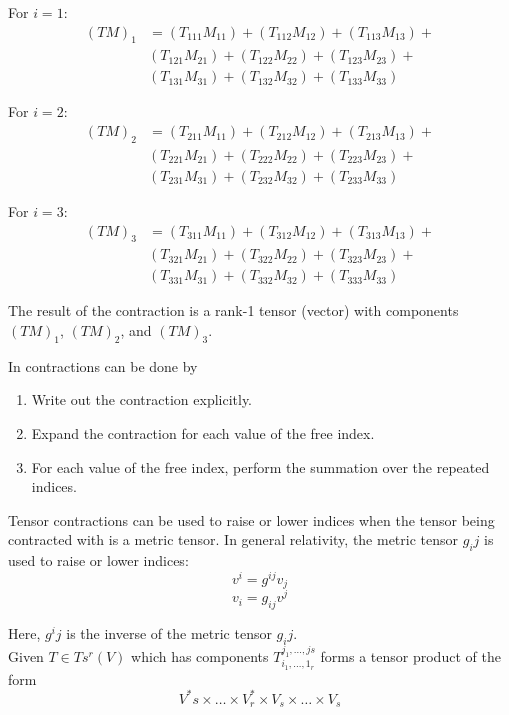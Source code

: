 For $i = 1$:
\begin{align*}
(TM)_1 &= (T_{111} M_{11}) + (T_{112} M_{12}) + (T_{113} M_{13}) + \\
        & (T_{121} M_{21}) + (T_{122} M_{22}) + (T_{123} M_{23}) + \\
        & (T_{131} M_{31}) + (T_{132} M_{32}) + (T_{133} M_{33})
\end{align*}


For $i = 2$:
\begin{align*}
(TM)_2 &= (T_{211} M_{11}) + (T_{212} M_{12}) + (T_{213} M_{13}) + \\
        & (T_{221} M_{21}) + (T_{222} M_{22}) + (T_{223} M_{23}) + \\
        & (T_{231} M_{31}) + (T_{232} M_{32}) + (T_{233} M_{33})
\end{align*}

For $i = 3$:
\begin{align*}
(TM)_3 &= (T_{311} M_{11}) + (T_{312} M_{12}) + (T_{313} M_{13}) + \\
        & (T_{321} M_{21}) + (T_{322} M_{22}) + (T_{323} M_{23}) + \\
        & (T_{331} M_{31}) + (T_{332} M_{32}) + (T_{333} M_{33})
\end{align*}

The result of the contraction is a rank-1 tensor (vector) with components $(TM)_1$, $(TM)_2$, and $(TM)_3$.

In contractions can be done by
\begin{enumerate}
\item Write out the contraction explicitly.
\item Expand the contraction for each value of the free index.
\item For each value of the free index, perform the summation over the repeated indices.
\end{enumerate}


Tensor contractions can be used to raise or lower indices when the tensor being contracted with
is a metric tensor.
In general relativity, the metric tensor $g_ij$ is used to raise or lower indices:
$$
v^i = g^{ij} v_j
$$
$$
v_i = g_{ij} v^j
$$

Here, $g^ij$ is the inverse of the metric tensor $g_ij$.
\\


Given $T \in T{s}^{r} (V)$ which has components $T_{i_1, \dots , 1_r }^{j_1 , \dots , js}$
forms a tensor product of the form
$$ 
V^{*}{s} \times \dots \times V^{*}_{r} \times V_s \times \dots \times V_s
$$


